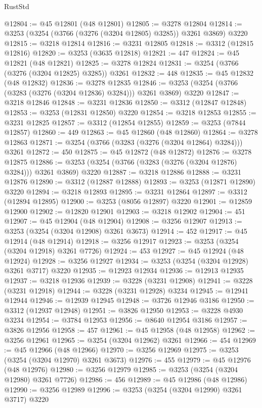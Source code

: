 \begin{lexlean}{RustStd}
\begin{coremodule}
@12804 := @45 @12801 (@48 @12801)
@12805 := @3278 @12804
@12814 := @3253 (@3254 (@3766 (@3276 (@3204 @12805) @3285)) @3261 @3869) @3220
@12815 := @3218 @12814
@12816 := @3231 @12805
@12818 := @3312 (@12815 @12816)
@12820 := @3253 (@3635 @12818)
@12821 := 447
@12824 := @45 @12821 (@48 @12821)
@12825 := @3278 @12824
@12831 := @3254 (@3766 (@3276 (@3204 @12825) @3285)) @3261
@12832 := 448
@12835 := @45 @12832 (@48 @12832)
@12836 := @3278 @12835
@12846 := @3253 (@3254 (@3766 (@3283 (@3276 (@3204 @12836) @3284))) @3261 @3869) @3220
@12847 := @3218 @12846
@12848 := @3231 @12836
@12850 := @3312 (@12847 @12848)
@12853 := @3253 (@12831 @12850) @3220
@12854 := @3218 @12853
@12855 := @3231 @12825
@12857 := @3312 (@12854 @12855)
@12859 := @3253 (@7844 @12857)
@12860 := 449
@12863 := @45 @12860 (@48 @12860)
@12864 := @3278 @12863
@12871 := @3254 (@3766 (@3283 (@3276 (@3204 @12864) @3284))) @3261
@12872 := 450
@12875 := @45 @12872 (@48 @12872)
@12876 := @3278 @12875
@12886 := @3253 (@3254 (@3766 (@3283 (@3276 (@3204 @12876) @3284))) @3261 @3869) @3220
@12887 := @3218 @12886
@12888 := @3231 @12876
@12890 := @3312 (@12887 @12888)
@12893 := @3253 (@12871 @12890) @3220
@12894 := @3218 @12893
@12895 := @3231 @12864
@12897 := @3312 (@12894 @12895)
@12900 := @3253 (@8056 @12897) @3220
@12901 := @12859 @12900
@12902 := @12820 @12901
@12903 := @3218 @12902
@12904 := 451
@12907 := @45 @12904 (@48 @12904)
@12908 := @3256 @12907
@12913 := @3253 (@3254 (@3204 @12908) @3261 @3673)
@12914 := 452
@12917 := @45 @12914 (@48 @12914)
@12918 := @3256 @12917
@12923 := @3253 (@3254 (@3204 @12918) @3261 @7726)
@12924 := 453
@12927 := @45 @12924 (@48 @12924)
@12928 := @3256 @12927
@12934 := @3253 (@3254 (@3204 @12928) @3261 @3717) @3220
@12935 := @12923 @12934
@12936 := @12913 @12935
@12937 := @3218 @12936
@12939 := @3228 (@3231 @12908)
@12941 := @3228 (@3231 @12918)
@12944 := @3228 (@3231 @12928) @3234
@12945 := @12941 @12944
@12946 := @12939 @12945
@12948 := @3726 @12946 @3186
@12950 := @3312 (@12937 @12948)
@12951 := @3826 @12950
@12953 := @3228 @4930 @3234
@12954 := @3784 @12953
@12956 := @8640 @12954 @3186
@12957 := @3826 @12956
@12958 := 457
@12961 := @45 @12958 (@48 @12958)
@12962 := @3256 @12961
@12965 := @3254 (@3204 @12962) @3261
@12966 := 454
@12969 := @45 @12966 (@48 @12966)
@12970 := @3256 @12969
@12975 := @3253 (@3254 (@3204 @12970) @3261 @3673)
@12976 := 455
@12979 := @45 @12976 (@48 @12976)
@12980 := @3256 @12979
@12985 := @3253 (@3254 (@3204 @12980) @3261 @7726)
@12986 := 456
@12989 := @45 @12986 (@48 @12986)
@12990 := @3256 @12989
@12996 := @3253 (@3254 (@3204 @12990) @3261 @3717) @3220

\end{coremodule}
\end{lexlean}
